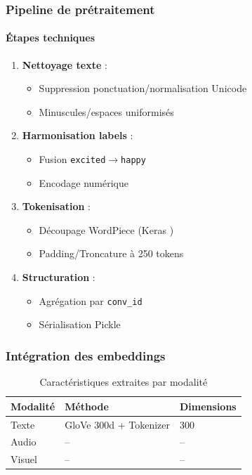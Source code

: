 \documentclass[a4paper,11pt]{article}
\begin{document}
\subsubsection{Pipeline de prétraitement}

\paragraph{Étapes techniques}
\begin{enumerate}
  \item \textbf{Nettoyage texte} :
    \begin{itemize}
      \item Suppression ponctuation/normalisation Unicode
      \item Minuscules/espaces uniformisés
    \end{itemize}
  
  \item \textbf{Harmonisation labels} :
    \begin{itemize}
      \item Fusion \texttt{excited}$\rightarrow$\texttt{happy}
      \item Encodage numérique
    \end{itemize}
  
  \item \textbf{Tokenisation} :
    \begin{itemize}
      \item Découpage WordPiece (Keras \cite{chollet2015keras})
      \item Padding/Troncature à 250 tokens
    \end{itemize}
  
  \item \textbf{Structuration} :
    \begin{itemize}
      \item Agrégation par \texttt{conv\_id}
      \item Sérialisation Pickle
    \end{itemize}
\end{enumerate}

\subsubsection{Intégration des embeddings}

\begin{table}[h]
  \centering
  \begin{tabular}{lll}
    \toprule
    Modalité & Méthode & Dimensions \\
    \midrule
    Texte & GloVe 300d + Tokenizer & 300 \\
    Audio & -- & -- \\
    Visuel & -- & -- \\
    \bottomrule
  \end{tabular}
  \caption{Caractéristiques extraites par modalité}
  \label{tab:feat_extr}
\end{table}
\end{document}
